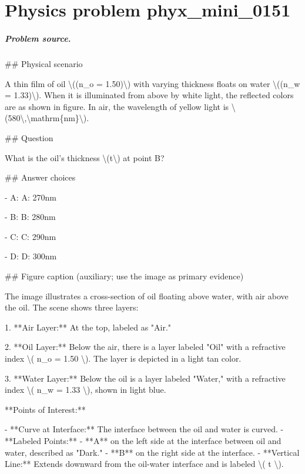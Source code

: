 
\chapter{Physics problem phyx\_mini\_0151}
\label{ch:PhyXMiniProblems_problem_phyx_mini_0151}

\paragraph{Problem source.}
\#\# Physical scenario

A thin film of oil \textbackslash{}((n\_o = 1.50)\textbackslash{}) with varying thickness floats on water \textbackslash{}((n\_w = 1.33)\textbackslash{}). When it is illuminated from above by white light, the reflected colors are as shown in figure. In air, the wavelength of yellow light is \textbackslash{}(580\textbackslash{},\textbackslash{}mathrm\{nm\}\textbackslash{}).

\#\# Question

What is the oil's thickness \textbackslash{}(t\textbackslash{}) at point B?

\#\# Answer choices

- A: A: 270nm

- B: B: 280nm

- C: C: 290nm

- D: D: 300nm

\#\# Figure caption (auxiliary; use the image as primary evidence)

The image illustrates a cross-section of oil floating above water, with air above the oil. The scene shows three layers:

1. **Air Layer:** At the top, labeled as "Air."

2. **Oil Layer:** Below the air, there is a layer labeled "Oil" with a refractive index \textbackslash{}( n\_o = 1.50 \textbackslash{}). The layer is depicted in a light tan color.

3. **Water Layer:** Below the oil is a layer labeled "Water," with a refractive index \textbackslash{}( n\_w = 1.33 \textbackslash{}), shown in light blue.

**Points of Interest:**

- **Curve at Interface:** The interface between the oil and water is curved.
- **Labeled Points:**
  - **A** on the left side at the interface between oil and water, described as "Dark."
  - **B** on the right side at the interface.
- **Vertical Line:** Extends downward from the oil-water interface and is labeled \textbackslash{}( t \textbackslash{}).
  

